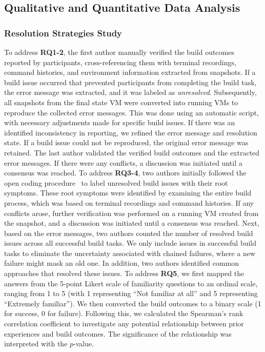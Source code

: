 \documentclass[10pt, conference]{IEEEtran}
\begin{document}
\subsection{Qualitative and Quantitative Data Analysis}
\subsubsection{Resolution Strategies Study}
\label{analysis2022}
To address \textbf{RQ1-2}, the first author manually verified the build outcomes reported by participants, cross-referencing them with terminal recordings, command histories, and environment information extracted from snapshots. If a build issue occurred that prevented participants from completing the build task, the error message was extracted, and it was labeled as \textit{unresolved}. Subsequently, all snapshots from the final state VM were converted into running VMs to reproduce the collected error messages. This was done using an automatic script, with necessary adjustments made for specific build issues. If there was an identified inconsistency in reporting, we refined the error message and resolution state. If a build issue could not be reproduced, the original error message was retained. The last author validated the verified build outcomes and the extracted error messages. If there were any conflicts, a discussion was initiated until a consensus was reached.
To address \textbf{RQ3-4}, two authors initially followed the open coding procedure~\cite{Seaman_1999} to label unresolved build issues with their root symptoms. These root symptoms were identified by examining the entire build process, which was based on terminal recordings and command histories. If any conflicts arose, further verification was performed on a running VM created from the snapshot, and a discussion was initiated until a consensus was reached. Next, based on the error messages, two authors counted the number of resolved build issues across all successful build tasks. We only include issues in successful build tasks to eliminate the uncertainty associated with chained failures, where a new failure might mask an old one. In addition, two authors identified common approaches that resolved these issues.
To address \textbf{RQ5}, we first mapped the answers from the 5-point Likert scale of familiarity questions to an ordinal scale, ranging from 1 to 5 (with 1 representing ``Not familiar at all'' and 5 representing ``Extremely familiar''). We then converted the build outcomes to a binary scale (1 for success, 0 for failure). Following this, we calculated the Spearman’s rank correlation coefficient to investigate any potential relationship between prior experiences and build outcomes. The significance of the relationship was interpreted with the $p$-value.
\end{document}
